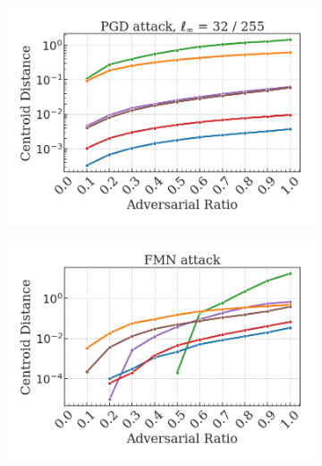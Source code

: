 \begin{figure}[H]
    \centering
    \begin{subfigure}[b]{0.45\textwidth}
        \centering
        \includegraphics[width=\textwidth]{img/results_discussion/adversarial/PGD_CD.png}
    \end{subfigure}
    \hfill
    \begin{subfigure}[b]{0.45\textwidth}
        \centering
        \includegraphics[width=\textwidth]{img/results_discussion/adversarial/FMN_CD.png}
    \end{subfigure}

    \vspace{1em}


\end{figure}
